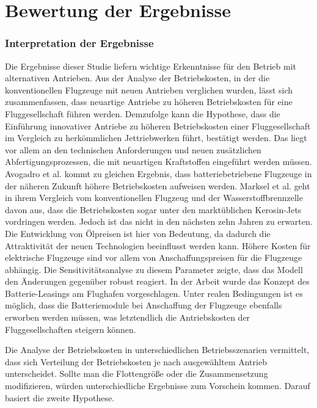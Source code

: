 \section{Bewertung der Ergebnisse}
\label{s:Bewertung der Ergebnisse}

\subsubsection{Interpretation der Ergebnisse}
Die Ergebnisse dieser Studie liefern wichtige Erkenntnisse für den Betrieb mit alternativen Antrieben.
Aus der Analyse der Betriebskosten, in der die konventionellen Flugzeuge mit neuen Antrieben verglichen wurden, 
lässt sich zusammenfassen, dass neuartige Antriebe zu höheren Betriebskosten für eine Fluggesellschaft führen werden.
Demzufolge kann die Hypothese, dass die Einführung innovativer Antriebe zu höheren 
Betriebskosten einer Fluggesellschaft im Vergleich zu herkömmlichen Jettriebwerken führt, bestätigt werden. 
Das liegt vor allem an den technischen Anforderungen und neuen zusätzlichen Abfertigungsprozessen, 
die mit neuartigen Kraftstoffen eingeführt werden müssen. 
Avogadro et al. \cite{avogadro2024demystifying} kommt zu gleichen Ergebnis, 
dass batteriebetriebene Flugzeuge in der näheren Zukunft höhere Betriebskosten aufweisen werden. 
Marksel et al. \cite{marksel2023comparative} geht in ihrem Vergleich vom konventionellen Flugzeug 
und der Wasserstoffbrennzelle davon aus, 
dass die Betriebskosten sogar unter den marktüblichen Kerosin-Jets vordringen werden. 
Jedoch ist das nicht in den nächsten zehn Jahren zu erwarten. 
Die Entwicklung von Ölpreisen ist hier von Bedeutung, 
da dadurch die Attraktivität der neuen Technologien beeinflusst werden kann.
%
Höhere Kosten für elektrische Flugzeuge sind vor allem von Anschaffungspreisen für die Flugzeuge abhängig. 
Die Sensitivitätsanalyse zu diesem Parameter zeigte, dass das Modell den Änderungen gegenüber robust reagiert.
In der Arbeit wurde das Konzept des Batterie-Leasings am Flughafen vorgeschlagen. 
Unter realen Bedingungen ist es möglich, dass die Batteriemodule bei Anschaffung 
der Flugzeuge ebenfalls erworben werden müssen, 
was letztendlich die Antriebskosten der Fluggesellschaften steigern können. 

%
Die Analyse der Betriebskosten in unterschiedlichen Betriebsszenarien vermittelt, 
dass sich Verteilung der Betriebskosten je nach ausgewähltem Antrieb unterscheidet. 
Sollte man die Flottengröße oder die Zusammensetzung modifizieren, 
würden unterschiedliche Ergebnisse zum Vorschein kommen.
Darauf basiert die zweite Hypothese. 

